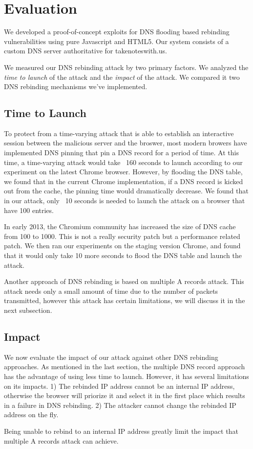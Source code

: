 \section{Evaluation}
\label{sec:eval}

We developed a proof-of-concept exploits for DNS flooding based rebinding vulnerabilities using pure Javascript and HTML5. Our system consists of a custom DNS server authoritative for takenoteswith.us.

We measured our DNS rebinding attack by two primary factors. We analyzed the \emph{time to launch} of the attack and the \emph{impact} of the attack. We compared it two DNS rebinding mechanisms we've implemented. 

\subsection{Time to Launch}
To protect from a time-varying attack that is able to establish an interactive session between the malicious server and the broswer, most modern browers have implemented DNS pinning that pin a DNS record for a period of time. At this time, a time-varying attack would take ~160 seconds to launch according to our experiment on the latest Chrome browser. However, by flooding the DNS table, we found that in the current Chrome implementation, if a DNS record is kicked out from the cache, the pinning time would dramatically decrease. We found that in our attack, only ~10 seconds is needed to launch the attack on a browser that have 100 entries. 

In early 2013, the Chromium community has increased the size of DNS cache from 100 to 1000. This is not a really security patch but a performance related patch. We then ran our experiments on the staging version Chrome, and found that it would only take 10 more seconds to flood the DNS table and launch the attack. 

Another approach of DNS rebinding is based on multiple A records attack. This attack needs only a small amount of time due to the number of packets transmitted, however this attack has certain limitations, we will discuss it in the next subsection.

\subsection{Impact}
We now evaluate the impact of our attack against other DNS rebinding approaches. As mentioned in the last section, the multiple DNS record approach has the advantage of using less time to launch. However, it has several limitations on its impacts. 1) The rebinded IP address cannot be an internal IP address, otherwise the browser will priorize it and select it in the first place which results in a failure in DNS rebinding.  2) The attacker cannot change the rebinded IP address on the fly. 

Being unable to rebind to an internal IP address greatly limit the impact that multiple A records attack can achieve.
